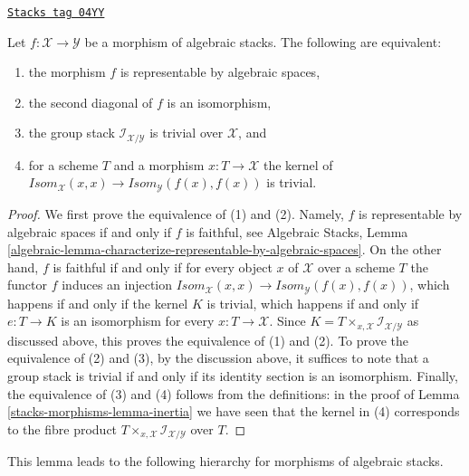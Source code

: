 \begin{lemma}
\label{stacks-morphisms-lemma-second-diagonal}
\href{https://stacks.math.columbia.edu/tag/04YY}{\texttt{Stacks tag 04YY}}

Let $f : \mathcal{X} \to \mathcal{Y}$ be a morphism of algebraic stacks.
The following are equivalent:
\begin{enumerate}
\item the morphism $f$ is representable by algebraic spaces,
\item the second diagonal of $f$ is an isomorphism,
\item the group stack $ \mathcal{I}_{\mathcal{X}/\mathcal{Y}}$
is trivial over $\mathcal X$, and
\item for a scheme $T$ and a morphism $x : T \to \mathcal{X}$
the kernel of $\mathit{Isom}_\mathcal{X}(x, x) \to
\mathit{Isom}_\mathcal{Y}(f(x), f(x))$ is trivial.
\end{enumerate}
\end{lemma}

\begin{proof}
We first prove the equivalence of (1) and (2).
Namely, $f$ is representable by algebraic spaces if and only if $f$ is
faithful, see
Algebraic Stacks,
Lemma \ref{algebraic-lemma-characterize-representable-by-algebraic-spaces}.
On the other hand, $f$ is faithful if and only if for every object $x$
of $\mathcal{X}$ over a scheme $T$ the functor $f$ induces an injection
$\mathit{Isom}_\mathcal{X}(x, x) \to
\mathit{Isom}_\mathcal{Y}(f(x), f(x))$,
which happens if and only if the kernel $K$ is trivial, which happens if and
only if $e : T \to K$ is an isomorphism for every $x : T \to \mathcal{X}$.
Since $K = T \times_{x, \mathcal{X}} \mathcal{I}_{\mathcal{X}/\mathcal{Y}}$
as discussed above, this proves the equivalence of (1) and (2). To prove
the equivalence of (2) and (3), by the discussion above, it suffices to
note that a group stack is trivial if and only if its identity section
is an isomorphism. Finally, the equivalence of (3) and (4) follows
from the definitions: in the proof of Lemma \ref{stacks-morphisms-lemma-inertia}
we have seen that the kernel in (4) corresponds to the fibre product
$T \times_{x, \mathcal{X}} \mathcal{I}_{\mathcal{X}/\mathcal{Y}}$ over $T$.
\end{proof}

This lemma leads to the following hierarchy for
morphisms of algebraic stacks.

